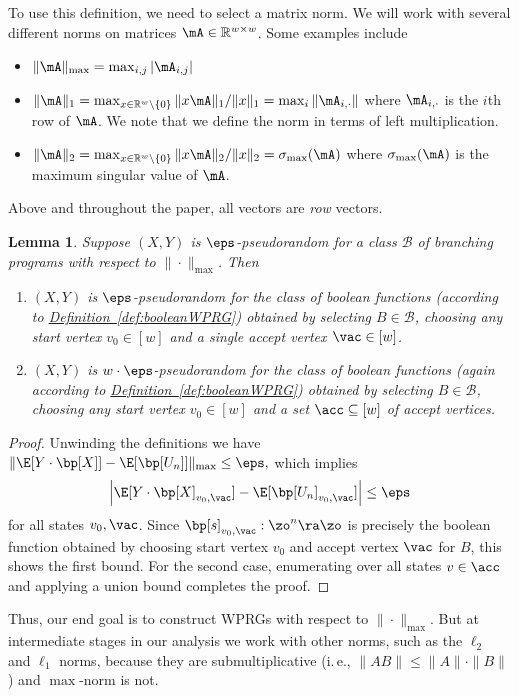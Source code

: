 \documentclass[11pt]{article}
\newcommand{\expref}[2]{\texorpdfstring{\hyperref[#2]{#1~\ref{#2}}}{#1~\ref{#2}}}
\newtheorem{lemma}[theorem]{Lemma}
\newcommand{\R}{{\mathbb R}}
\newcommand{\ie}{i.\,e.}
\begin{document}
To use this definition, we need to select a matrix norm. We will work with several different norms on matrices $\mA \in \R^{w\times w}$. Some examples include %
\begin{itemize}
    \item $\|\mA\|_{\max} = \max_{i,j}|\mA_{i,j}|$
    \item $\|\mA\|_{1} = \max_{x\in \R^w\setminus\{0\}}\|x\mA\|_1/\|x\|_1 = \max_i \|\mA_{i,\cdot}\|$ where $\mA_{i,\cdot}$ is the $i$th row of $\mA$. We note that we define the norm in terms of left multiplication.
    \item $\|\mA\|_2 = \max_{x\in \R^w\setminus \{0\}} \|x\mA \|_2/\|x\|_2=\sigma_{\max}(\mA)$ where $\sigma_{\max}(\mA)$ is the maximum singular value of $\mA$.
\end{itemize}
Above and throughout the paper, all vectors are \emph{row} vectors.
\begin{lemma}
Suppose $(X,Y)$ is $\eps$-pseudorandom for a class $\mathcal{B}$ of branching programs with respect to $\|\cdot\|_{\max}$. Then
\begin{enumerate}
    \item $(X,Y)$ is $\eps$-pseudorandom for the class of boolean functions (according to \expref{Definition}{def:booleanWPRG}) obtained by selecting $B\in \mathcal{B}$, choosing any start vertex $v_0\in[w]$ and a single accept vertex $\vac\in [w]$.
    \item $(X,Y)$ is $w\cdot \eps$-pseudorandom for the class of boolean functions (again according to \expref{Definition}{def:booleanWPRG}) obtained by selecting $B\in \mathcal{B}$, choosing any start vertex $v_0\in[w]$ and a set $\acc\subseteq[w]$ of accept vertices.
\end{enumerate}
\end{lemma}
\begin{proof}
Unwinding the definitions we have
$\| \E[Y\cdot \bp[X]] - \E[\bp[U_n]]\|_{\max}\leq \eps,$
which implies 
$$\left| \E[Y\cdot \bp[X]_{v_0,\vac}] - \E[\bp[U_n]_{v_0,\vac}]\right|\leq \eps$$
for all states $v_0,\vac$. Since $\bp[s]_{v_0,\vac}:\zo^n\ra \zo$ is precisely the boolean function obtained by choosing start vertex $v_0$ and accept vertex $\vac$ for $B$, this shows the first bound. For the second case, enumerating over all states $v\in \acc$ and applying a union bound completes the proof. 
\end{proof}
Thus, our end goal is to construct WPRGs with respect to $\|\cdot\|_{\max}$. But at intermediate stages in our analysis we work with other norms, such as the $\ell_2$ and $\ell_1$ norms, because they are submultiplicative (\ie, $\|AB\|\leq \|A\|\cdot\|B\|$) and $\max$-norm is not.
\end{document}
